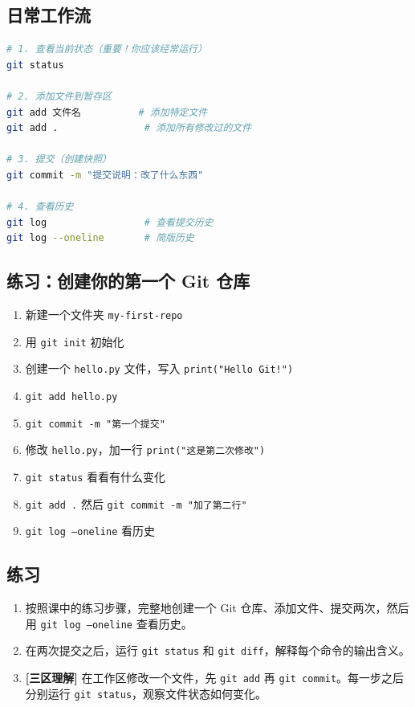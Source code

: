 \documentclass[a4paper,12pt]{ctexart}
\begin{document}
\subsection*{日常工作流}

\begin{lstlisting}[language=bash]
# 1. 查看当前状态（重要！你应该经常运行）
git status

# 2. 添加文件到暂存区
git add 文件名          # 添加特定文件
git add .               # 添加所有修改过的文件

# 3. 提交（创建快照）
git commit -m "提交说明：改了什么东西"

# 4. 查看历史
git log                 # 查看提交历史
git log --oneline       # 简版历史
\end{lstlisting}

\subsection*{练习：创建你的第一个 Git 仓库}

\begin{enumerate}
  \item 新建一个文件夹 \texttt{my-first-repo}
  \item 用 \texttt{git init} 初始化
  \item 创建一个 \texttt{hello.py} 文件，写入 \texttt{print("Hello Git!")}
  \item \texttt{git add hello.py}
  \item \texttt{git commit -m "第一个提交"}
  \item 修改 \texttt{hello.py}，加一行 \texttt{print("这是第二次修改")}
  \item \texttt{git status} 看看有什么变化
  \item \texttt{git add .} 然后 \texttt{git commit -m "加了第二行"}
  \item \texttt{git log --oneline} 看历史
\end{enumerate}

\subsection*{练习}

\begin{enumerate}
  \item 按照课中的练习步骤，完整地创建一个 Git 仓库、添加文件、提交两次，然后用 \texttt{git log --oneline} 查看历史。
  \item 在两次提交之后，运行 \texttt{git status} 和 \texttt{git diff}，解释每个命令的输出含义。
  \item \textbf{[三区理解]} 在工作区修改一个文件，先 \texttt{git add} 再 \texttt{git commit}。每一步之后分别运行 \texttt{git status}，观察文件状态如何变化。
\end{enumerate}
\end{document}
